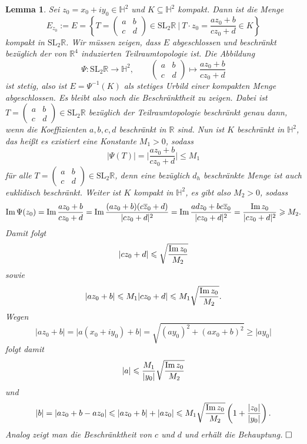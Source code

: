 \documentclass[11pt]{book}
\numberwithin{dummy}{section}
\newtheorem{lemma}[theorem]{Lemma}
\theoremstyle{nonumberbreak}
\newenvironment{pr}[1][]{\ifthenelse{\equal{#1}{}}{\proof}{\proof[#1]}\rm}{\endproof}
\newcommand{\Imm}{\mathrm{Im}\hspace{1.5pt}}
\newcommand{\R}{\mathbb{R}}
\newcommand{\He}{\mathbb{H}}
\newcommand{\la}{\longrightarrow}
\begin{document}
\begin{spacing}{1.4}
\begin{lemma}
Sei $z_0=x_0+iy_0 \in \He^2$ und $K \subseteq \He^2$ kompakt. Dann ist die Menge 
$$E_{z_0}:=E= \left\{T= \begin{pmatrix}a&b\\[-6pt] c&d \end{pmatrix} \in \mathrm{SL}_2\R \ \bigg\vert \ T\cdot z_0 = \frac{az_0+b}{cz_0+d} \in K \right\}$$
kompakt in $\mathrm{SL}_2\R$.
\begin{pr}
Wir müssen zeigen, dass $E$ abgeschlossen und beschränkt bezüglich der von $\R^4$ induzierten Teilraumtopologie ist. Die Abbildung
$$\Psi: \mathrm{SL}_2\R \la \He^2, \qquad \begin{pmatrix}a&b \\[-6pt]c&d\end{pmatrix} \mapsto \frac{az_0+b}{cz_0+d}$$
ist stetig, also ist $E= \Psi^{-1}(K)$ als stetiges Urbild einer kompakten Menge abgeschlossen. Es bleibt also noch die Beschränktheit zu zeigen. Dabei ist $T= \begin{pmatrix}a&b\\[-6pt] c&d \end{pmatrix} \in \mathrm{SL}_2\R$ bezüglich der Teilraumtopologie beschränkt genau dann, wenn die Koeffizienten $a,b,c,d$ beschränkt in $\R$ sind. Nun ist $K$ beschränkt in $\He^2$, das heißt es existiert eine Konstante $M_1 >0$, sodass
$$\vert \Psi(T) \vert = \bigg \vert \frac{az_0+b}{cz_0+d} \bigg\vert \leqslant M_1$$
für alle $T= \begin{pmatrix}a&b\\[-6pt] c&d \end{pmatrix} \in \mathrm{SL}_2\R$, denn eine bezüglich $d_h$ beschränkte Menge ist auch euklidisch beschränkt. Weiter ist $K$ kompakt in $\He^2$, es gibt also $M_2>0$, sodass
$$\mathrm{Im} \hspace{1.5pt} \Psi(z_0) = \mathrm{Im} \hspace{1.5pt} \frac{az_0+b}{cz_0+d} = \Imm \frac{(az_0+b)(c\overline{z}_0+d)}{\vert cz_0+d\vert^2} =\Imm \frac{adz_0+bc\overline{z}_0}{\vert cz_0+d\vert^2}= \frac{\mathrm{Im}\hspace{1.5pt} z_0}{\vert cz_0+d\vert^2} \geqslant M_2.$$
Damit folgt
$$\vert cz_0+d\vert \leqslant \sqrt{\frac{\mathrm{Im}\hspace{1.5pt} z_0}{M_2}}$$
sowie
$$\vert az_0+b\vert \leqslant M_1 \vert cz_0+d\vert \leqslant M_1 \sqrt{\frac{\mathrm{Im} \hspace{1.5pt} z_0}{M_2}}.$$
Wegen 
$$\vert az_0+b\vert = \vert a(x_0+iy_0)+b\vert = \sqrt{ (ay_0)^2 + (ax_0+b)^2} \geqslant \vert ay_0\vert$$
folgt damit 
$$\vert a \vert \leqslant \frac{M_1}{\vert y_0\vert} \sqrt{\frac{\mathrm{Im} \hspace{1.5pt} z_0}{M_2}}$$
und
$$\vert b \vert = \vert az_0+b-az_0 \vert \leqslant \vert az_0+b\vert + \vert az_0 \vert \leqslant M_1 \sqrt{\frac{\mathrm{Im}\hspace{1.5pt} z_0}{M_2}} \left( 1 + \frac{\vert z_0\vert}{\vert y_0\vert} \right).$$
Analog zeigt man die Beschränktheit von $c$ und $d$ und erhält die Behauptung. $\hfill \Box$


\end{pr}
\end{lemma}
\end{spacing}
\end{document}
